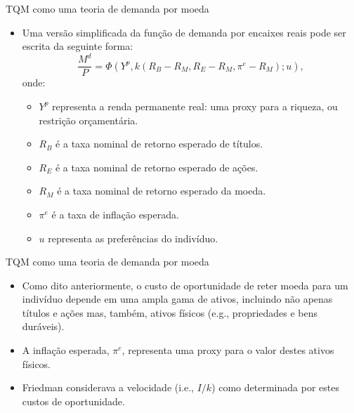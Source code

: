 \documentclass[10pt]{beamer}
\begin{document}
\begin{frame}{TQM como uma teoria de demanda por moeda}
    \begin{itemize}
        \item Uma versão simplificada da função de demanda por encaixes reais pode ser escrita da seguinte forma:
        \begin{equation}
            \frac{M^d}{P} = \Phi(Y^p, k(R_B - R_M, R_E-R_M, \pi^e-R_M); u),
            \label{eq1}
        \end{equation}
        onde:
        \begin{itemize}
            \item $Y^p$ representa a renda permanente real: uma proxy para a riqueza, ou restrição orçamentária.
            \bigskip
            \item $R_B$ é a taxa nominal de retorno esperado de títulos.
            \bigskip
            \item $R_E$ é a taxa nominal de retorno esperado de ações.
            \bigskip
            \item $R_M$ é a taxa nominal de retorno esperado da moeda.
            \bigskip
            \item $\pi^e$ é a taxa de inflação esperada.
            \bigskip
            \item $u$ representa as preferências do indivíduo.
        \end{itemize}
    \end{itemize}
\end{frame}

\begin{frame}{TQM como uma teoria de demanda por moeda}
    \begin{itemize}
        \item Como dito anteriormente, o custo de oportunidade de reter moeda para um indivíduo depende em uma ampla gama de ativos, incluindo não apenas títulos e ações mas, também, ativos físicos (e.g., propriedades e bens duráveis).
        \bigskip
        \item A inflação esperada, $\pi^e$, representa uma proxy para o valor destes ativos físicos.
        \bigskip
        \item Friedman considerava a velocidade (i.e., $I/k$) como determinada por estes custos de oportunidade.
    \end{itemize}
\end{frame}
\end{document}
